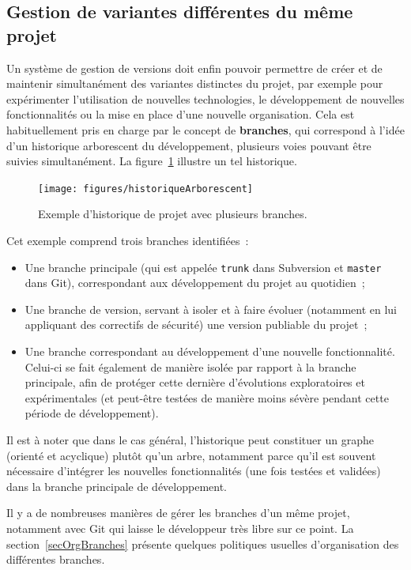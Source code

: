 \subsection{Gestion de variantes différentes du même projet}

Un système de gestion de versions doit enfin pouvoir permettre de
créer et de maintenir simultanément des variantes distinctes du
projet, par exemple pour expérimenter l'utilisation de nouvelles
technologies, le développement de nouvelles fonctionnalités ou la mise
en place d'une nouvelle organisation. Cela est habituellement pris en
charge par le concept de \textbf{branches}, qui
correspond à l'idée d'un historique arborescent du développement,
plusieurs voies pouvant être suivies simultanément. La
figure~\ref{fig:historiqueArborescent} illustre un tel historique.

\begin{figure}[h!]
  \texttt{[image: figures/historiqueArborescent]}
  \caption{Exemple d'historique de projet avec plusieurs
    branches.\label{fig:historiqueArborescent}}
\end{figure}

Cet exemple comprend trois branches identifiées~:
\begin{itemize}
\item Une branche principale (qui est appelée \texttt{trunk} dans
  Subversion et \texttt{master}
  dans Git), correspondant aux développement du projet au quotidien~;
\item Une branche de version, servant à isoler et à faire évoluer
  (notamment en lui appliquant des correctifs de sécurité) une version
  publiable du projet~;
\item Une branche correspondant au développement d'une nouvelle
  fonctionnalité. Celui-ci se fait également de manière isolée par
  rapport à la branche principale, afin de protéger cette dernière
  d'évolutions exploratoires et expérimentales (et peut-être testées
  de manière moins sévère pendant cette période de développement).
\end{itemize}
Il est à noter que dans le cas général, l'historique peut constituer
un graphe (orienté et acyclique) plutôt qu'un arbre, notamment parce
qu'il est souvent nécessaire d'intégrer les nouvelles fonctionnalités
(une fois testées et validées) dans la branche principale de
développement.

Il y a de nombreuses manières de gérer les branches d'un même projet,
notamment avec Git qui laisse le développeur très libre sur ce
point. La section~\ref{secOrgBranches} présente quelques politiques
usuelles d'organisation des différentes branches.

